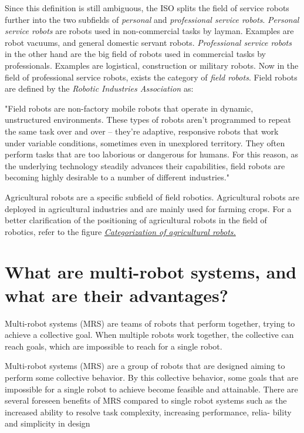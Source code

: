         Since this definition is still ambiguous, the ISO splits the field of service robots further into the two subfields of \emph{personal} and \emph{professional service robots}. \emph{Personal service robots} are robots used in non-commercial tasks by layman. Examples are robot vacuums, and general domestic servant robots. \emph{Professional service robots} in the other hand are the big field of robots used in commercial tasks by professionals. Examples are logistical, construction or military robots.
        Now in the field of professional service robots, exists the category of \emph{field robots}. Field robots are defined by the \emph{Robotic Industries Association} as:
        \begin{displayquote}
            "Field robots are non-factory mobile robots that operate in dynamic, unstructured environments. These types of robots aren’t programmed to repeat the same task over and over – they’re adaptive, responsive robots that work under variable conditions, sometimes even in unexplored territory. They often perform tasks that are too laborious or dangerous for humans. For this reason, as the underlying technology steadily advances their capabilities, field robots are becoming highly desirable to a number of different industries."
        \end{displayquote}

        Agricultural robots are a specific subfield of field robotics. Agricultural robots are deployed in agricultural industries and are mainly used for farming crops. For a better clarification of the positioning of agricultural robots in the field of robotics, refer to the figure \hyperlink{fig:category_mindmap}{\emph{Categorization of agricultural robots.}}

        \section{What are multi-robot systems, and what are their advantages?}

        Multi-robot systems (MRS) are teams of robots that perform together, trying to achieve a collective goal. When multiple robots work together, the collective can reach goals, which are impossible to reach for a single robot.

        Multi-robot systems (MRS) are a group of robots that are designed
aiming to perform some collective behavior. By this collective behavior, some goals
that are impossible for a single robot to achieve become feasible and attainable.
There are several foreseen benefits of MRS compared to single robot systems such
as the increased ability to resolve task complexity, increasing performance, relia-
bility and simplicity in design


